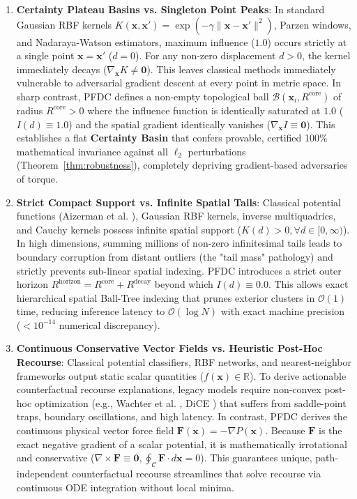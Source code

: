 \documentclass[preprint,review,12pt]{elsarticle}
\begin{document}
\begin{enumerate}
    \item \textbf{Certainty Plateau Basins vs. Singleton Point Peaks}: In standard Gaussian RBF kernels $K(\mathbf{x}, \mathbf{x}') = \exp(-\gamma \|\mathbf{x} - \mathbf{x}'\|^2)$, Parzen windows, and Nadaraya-Watson estimators, maximum influence ($1.0$) occurs strictly at a single point $\mathbf{x} = \mathbf{x}'$ ($d=0$). For any non-zero displacement $d > 0$, the kernel immediately decays ($\nabla_{\mathbf{x}} K \ne \mathbf{0}$). This leaves classical methods immediately vulnerable to adversarial gradient descent at every point in metric space. In sharp contrast, PFDC defines a non-empty topological ball $\mathcal{B}(\mathbf{x}_i, R^{\mathrm{core}})$ of radius $R^{\mathrm{core}} > 0$ where the influence function is identically saturated at $1.0$ ($I(d) \equiv 1.0$) and the spatial gradient identically vanishes ($\nabla_{\mathbf{x}} I \equiv \mathbf{0}$). This establishes a flat \textbf{Certainty Basin} that confers provable, certified 100\% mathematical invariance against all $\ell_2$ perturbations (Theorem~\ref{thm:robustness}), completely depriving gradient-based adversaries of torque.
    \item \textbf{Strict Compact Support vs. Infinite Spatial Tails}: Classical potential functions (Aizerman et al. \cite{aizerman1964theoretical}), Gaussian RBF kernels, inverse multiquadrics, and Cauchy kernels possess infinite spatial support ($K(d) > 0, \forall d \in [0, \infty)$). In high dimensions, summing millions of non-zero infinitesimal tails leads to boundary corruption from distant outliers (the "tail mass" pathology) and strictly prevents sub-linear spatial indexing. PFDC introduces a strict outer horizon $R^{\mathrm{horizon}} = R^{\mathrm{core}} + R^{\mathrm{decay}}$ beyond which $I(d) \equiv 0.0$. This allows exact hierarchical spatial Ball-Tree indexing that prunes exterior clusters in $\mathcal{O}(1)$ time, reducing inference latency to $\mathcal{O}(\log N)$ with exact machine precision ($< 10^{-14}$ numerical discrepancy).
    \item \textbf{Continuous Conservative Vector Fields vs. Heuristic Post-Hoc Recourse}: Classical potential classifiers, RBF networks, and nearest-neighbor frameworks output static scalar quantities ($f(\mathbf{x}) \in \mathbb{R}$). To derive actionable counterfactual recourse explanations, legacy models require non-convex post-hoc optimization (e.g., Wachter et al. \cite{wachter2017counterfactual}, DiCE \cite{mothilal2020explaining}) that suffers from saddle-point traps, boundary oscillations, and high latency. In contrast, PFDC derives the continuous physical vector force field $\mathbf{F}(\mathbf{x}) = -\nabla P(\mathbf{x})$. Because $\mathbf{F}$ is the exact negative gradient of a scalar potential, it is mathematically irrotational and conservative ($\nabla \times \mathbf{F} \equiv \mathbf{0}, \oint_{\mathcal{C}} \mathbf{F} \cdot d\mathbf{x} = 0$). This guarantees unique, path-independent counterfactual recourse streamlines that solve recourse via continuous ODE integration without local minima.

\end{enumerate}
\end{document}
